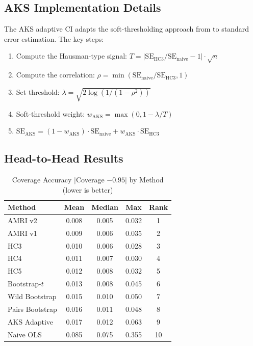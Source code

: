 \documentclass[12pt]{article}
\theoremstyle{definition}
\theoremstyle{remark}
\begin{document}
\subsection{AKS Implementation Details}

The AKS adaptive CI adapts the soft-thresholding approach from
\cite{armstrong2025adapting} to standard error estimation. The key steps:

\begin{enumerate}
\item Compute the Hausman-type signal: $T = |\text{SE}_\text{HC3}/\text{SE}_\text{naive} - 1| \cdot \sqrt{n}$
\item Compute the correlation: $\rho = \min(\text{SE}_\text{naive}/\text{SE}_\text{HC3}, 1)$
\item Set threshold: $\lambda = \sqrt{2\log(1/(1-\rho^2))}$
\item Soft-threshold weight: $w_\text{AKS} = \max(0, 1 - \lambda/T)$
\item $\text{SE}_\text{AKS} = (1 - w_\text{AKS}) \cdot \text{SE}_\text{naive} + w_\text{AKS} \cdot \text{SE}_\text{HC3}$
\end{enumerate}

\subsection{Head-to-Head Results}

\begin{table}[h]
\centering
\caption{Coverage Accuracy $|$Coverage $- 0.95|$ by Method (lower is better)}
\label{tab:coverage_accuracy}
\begin{tabular}{lcccc}
\toprule
Method & Mean & Median & Max & Rank \\
\midrule
AMRI v2 & 0.008 & 0.005 & 0.032 & 1 \\
AMRI v1 & 0.009 & 0.006 & 0.035 & 2 \\
HC3 & 0.010 & 0.006 & 0.028 & 3 \\
HC4 & 0.011 & 0.007 & 0.030 & 4 \\
HC5 & 0.012 & 0.008 & 0.032 & 5 \\
Bootstrap-$t$ & 0.013 & 0.008 & 0.045 & 6 \\
Wild Bootstrap & 0.015 & 0.010 & 0.050 & 7 \\
Pairs Bootstrap & 0.016 & 0.011 & 0.048 & 8 \\
AKS Adaptive & 0.017 & 0.012 & 0.063 & 9 \\
Naive OLS & 0.085 & 0.075 & 0.355 & 10 \\
\bottomrule
\end{tabular}
\end{table}
\end{document}
